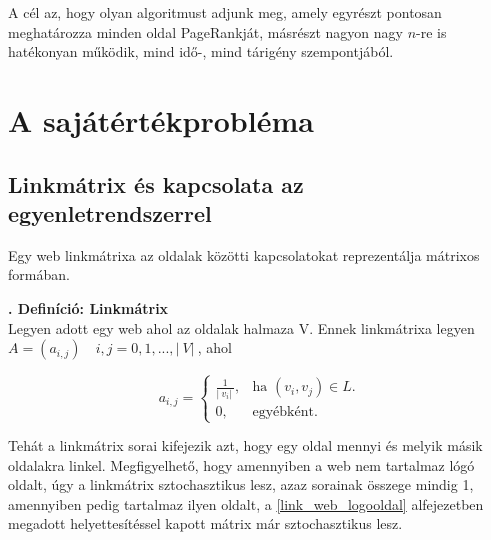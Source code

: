 \documentclass[12pt,a4paper]{article}
\newcounter{definicioszam}
\newenvironment{definicio}[1]
{{\medskip}\noindent \stepcounter{definicioszam}
{\bfseries{\thedefinicioszam. Definíció: #1\\[1ex]}}}{\bigskip }
\begin{document}
A cél az, hogy olyan algoritmust adjunk meg, amely egyrészt pontosan meghatározza minden oldal PageRankját, másrészt nagyon nagy $n$-re is hatékonyan működik, mind idő-, mind tárigény szempontjából. 

\section{A sajátértékprobléma}

\subsection{Linkmátrix és kapcsolata az egyenletrendszerrel}\label{linkmatrix}

Egy web linkmátrixa az oldalak közötti kapcsolatokat reprezentálja mátrixos formában.

\begin{definicio}{Linkmátrix}
	Legyen adott egy web ahol az oldalak halmaza V. Ennek linkmátrixa legyen $A = (a_{i,j}) \quad i,j = 0,1,...,|\ V |\ $, ahol
	
	\begin{equation}
	a_{i,j}=\begin{cases}
	\frac{1}{ |\ v_i |\ }, & \text{ha $(v_i,v_j) \in L$}.\\
	0, & \text{egyébként}.
	\end{cases}
	\end{equation}
	
\end{definicio}

Tehát a linkmátrix sorai kifejezik azt, hogy egy oldal mennyi és melyik másik oldalakra linkel. Megfigyelhető, hogy amennyiben a web nem tartalmaz lógó oldalt, úgy a linkmátrix sztochasztikus lesz, azaz sorainak összege mindig 1, amennyiben pedig tartalmaz ilyen oldalt, a \ref{link_web_logooldal} alfejezetben megadott helyettesítéssel kapott mátrix már sztochasztikus lesz. 

\bigskip
\end{document}
